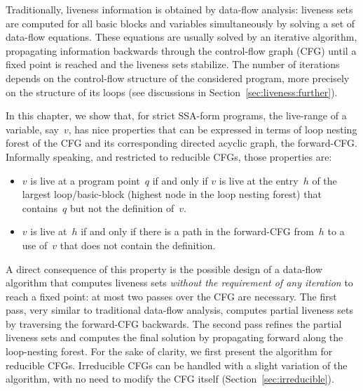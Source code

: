 
Traditionally, liveness information is obtained by data-flow analysis:
liveness sets are computed for all basic blocks and variables simultaneously by solving a set of data-flow equations.
These equations are usually solved by an iterative algorithm, propagating information backwards through the control-flow graph (CFG) until a fixed point is reached and the liveness sets stabilize.
The number of iterations depends on the control-flow structure of the considered program, more precisely on the structure of its loops (see discussions in Section~\ref{sec:liveness:further}).

In this chapter, we show that, for strict SSA-form programs, the live-range of a variable, say~$v$, has nice properties that can be expressed in terms of loop nesting forest of the CFG and its corresponding directed acyclic graph, the forward-CFG.
Informally speaking, and restricted to reducible CFGs, those properties are:
\begin{itemize}
\item
	$v$ is live at a program point~$q$ if and only if $v$ is live at the entry~$h$ of the largest loop/basic-block (highest node in the loop nesting forest) that contains~$q$ but not the definition of~$v$.
\item
	$v$ is live at~$h$ if and only if there is a path in the forward-CFG from~$h$ to a use of~$v$ that does not contain the definition.
\end{itemize}


A direct consequence of this property is the possible design of a data-flow algorithm that computes liveness sets \emph{without the requirement of any iteration} to reach a fixed point:
at most two passes over the CFG are necessary.
The first pass, very similar to traditional data-flow analysis, computes partial liveness sets by traversing the forward-CFG backwards.
The second pass refines the partial liveness sets and computes the final solution by propagating forward along the loop-nesting forest.
For the sake of clarity, we first present the algorithm for reducible CFGs.
Irreducible CFGs can be handled with a slight variation of the algorithm, with no need to modify the CFG itself (Section~\ref{sec:irreducible}).

